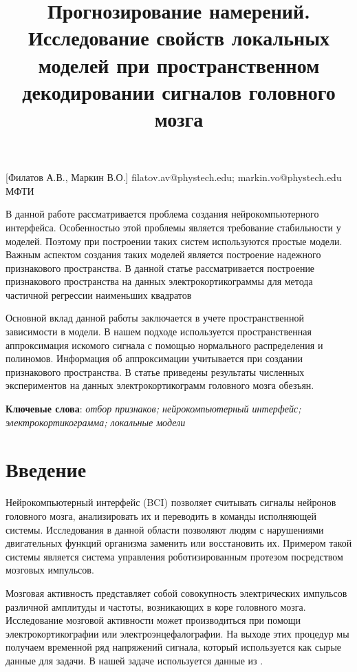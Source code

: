 \documentclass[12pt, twoside]{article}
\begin{document}
\title
    [Прогнозирование намерений] %
    {Прогнозирование намерений. Исследование свойств локальных моделей при пространственном декодировании сигналов головного мозга}
\author
[] %
{} %
[Филатов А.В., Маркин В.О.] %
\email
{filatov.av@phystech.edu; markin.vo@phystech.edu}
\organization
{МФТИ}
\abstract
    {
		В данной работе рассматривается проблема создания нейрокомпьютерного интерфейса. Особенностью этой проблемы является требование стабильности у моделей. Поэтому при построении таких систем используются простые модели. Важным аспектом создания таких моделей является построение надежного признакового пространства. В данной статье рассматривается построение признакового пространства на данных электрокортикограммы для метода частичной регрессии наименьших квадратов
		
		Основной вклад данной работы заключается в учете пространственной зависимости в модели. В нашем подходе используется пространственная аппроксимация искомого сигнала с помощью нормального распределения и полиномов. Информация об аппроксимации учитывается при создании признакового пространства. В статье приведены результаты численных экспериментов на данных электрокортикограмм головного мозга обезъян.
		
\bigskip
\noindent
\textbf{Ключевые слова}: \emph {отбор признаков; нейрокомпьютерный интерфейс; электрокортикограмма; локальные модели }
}

\maketitle
\section{Введение}
Нейрокомпьютерный интерфейс (BCI) \cite{shih2012brain} позволяет считывать сигналы нейронов головного мозга, анализировать их   и переводить в команды исполняющей системы. Исследования в данной области позволяют людям с нарушениями двигательных функций организма заменить или восстановить их. Примером такой системы является система управления роботизированным протезом посредством мозговых импульсов. 

Мозговая активность представляет собой совокупность электрических импульсов различной амплитуды и частоты, возникающих в коре головного мозга. Исследование мозговой активности может производиться при помощи  электрокортикографии \cite{hill2012recording} или \cite{aminoff2012electroencephalography} электроэнцефалографии. На выходе этих процедур мы получаем временной ряд напряжений сигнала, который используется как сырые данные для задачи. В нашей задаче используется данные из \cite{chao2010long}.
\end{document}
